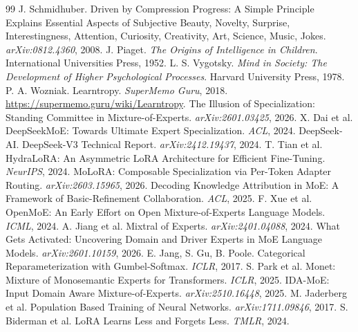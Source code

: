 \documentclass{article}
\begin{document}
\begin{thebibliography}{99}
 J. Schmidhuber. Driven by Compression Progress: A Simple Principle Explains Essential Aspects of Subjective Beauty, Novelty, Surprise, Interestingness, Attention, Curiosity, Creativity, Art, Science, Music, Jokes. \textit{arXiv:0812.4360}, 2008.
 J. Piaget. \textit{The Origins of Intelligence in Children}. International Universities Press, 1952.
 L. S. Vygotsky. \textit{Mind in Society: The Development of Higher Psychological Processes}. Harvard University Press, 1978.
 P. A. Wozniak. Learntropy. \textit{SuperMemo Guru}, 2018. \url{https://supermemo.guru/wiki/Learntropy}.
 The Illusion of Specialization: Standing Committee in Mixture-of-Experts. \textit{arXiv:2601.03425}, 2026.
 X. Dai et al. DeepSeekMoE: Towards Ultimate Expert Specialization. \textit{ACL}, 2024.
 DeepSeek-AI. DeepSeek-V3 Technical Report. \textit{arXiv:2412.19437}, 2024.
 T. Tian et al. HydraLoRA: An Asymmetric LoRA Architecture for Efficient Fine-Tuning. \textit{NeurIPS}, 2024.
 MoLoRA: Composable Specialization via Per-Token Adapter Routing. \textit{arXiv:2603.15965}, 2026.
 Decoding Knowledge Attribution in MoE: A Framework of Basic-Refinement Collaboration. \textit{ACL}, 2025.
 F. Xue et al. OpenMoE: An Early Effort on Open Mixture-of-Experts Language Models. \textit{ICML}, 2024.
 A. Jiang et al. Mixtral of Experts. \textit{arXiv:2401.04088}, 2024.
 What Gets Activated: Uncovering Domain and Driver Experts in MoE Language Models. \textit{arXiv:2601.10159}, 2026.
 E. Jang, S. Gu, B. Poole. Categorical Reparameterization with Gumbel-Softmax. \textit{ICLR}, 2017.
 S. Park et al. Monet: Mixture of Monosemantic Experts for Transformers. \textit{ICLR}, 2025.
 IDA-MoE: Input Domain Aware Mixture-of-Experts. \textit{arXiv:2510.16448}, 2025.
 M. Jaderberg et al. Population Based Training of Neural Networks. \textit{arXiv:1711.09846}, 2017.
 S. Biderman et al. LoRA Learns Less and Forgets Less. \textit{TMLR}, 2024.
\end{thebibliography}
\end{document}
